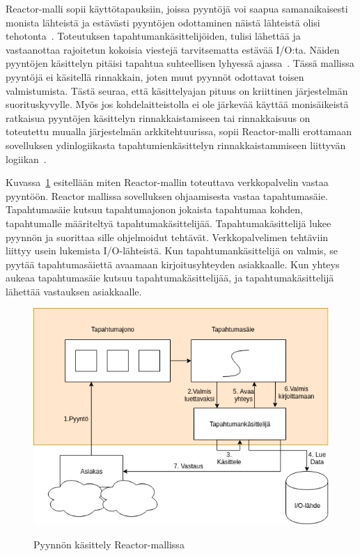\documentclass[finnish]{tktltiki2}
\theoremstyle{definition}
\theoremstyle{remark}
\begin{document}
Reactor-malli sopii käyttötapauksiin, joissa pyyntöjä voi saapua
samanaikaisesti monista lähteistä ja estävästi
pyyntöjen odottaminen näistä lähteistä olisi tehotonta~\cite{schmidt_reactor:_1995}.
Toteutuksen tapahtumankäsittelijöiden, tulisi
lähettää ja vastaanottaa rajoitetun kokoisia viestejä
tarvitsematta estävää I/O:ta.
Näiden pyyntöjen käsittelyn
pitäisi tapahtua suhteellisen lyhyessä ajassa~\cite{schmidt_reactor:_1995}.
Tässä mallissa pyyntöjä ei käsitellä rinnakkain, joten muut
pyynnöt odottavat toisen valmistumista.
Tästä seuraa, että käsittelyajan pituus on kriittinen järjestelmän
suorituskyvylle.
Myös jos kohdelaitteistolla ei ole järkevää käyttää monisäikeistä
ratkaisua pyyntöjen käsittelyn rinnakkaistamiseen tai rinnakkaisuus
on toteutettu muualla järjestelmän arkkitehtuurissa, sopii Reactor-malli
erottamaan sovelluksen ydinlogiikasta tapahtumienkäsittelyn
rinnakkaistammiseen liittyvän logiikan~\cite{schmidt_reactor:_1995}.

Kuvassa~\ref{fig:reactor} esitellään miten Reactor-mallin toteuttava verkkopalvelin
vastaa pyyntöön.
Reactor mallissa sovelluksen ohjaamisesta vastaa tapahtumasäie.
Tapahtumasäie kutsuu tapahtumajonon jokaista tapahtumaa kohden, tapahtumalle
määriteltyä tapahtumakäsittelijää. Tapahtumakäsittelijä
lukee pyynnön ja suorittaa sille ohjelmoidut tehtävät. Verkkopalvelimen
tehtäviin liittyy usein lukemista I/O-lähteistä.
Kun tapahtumankäsittelijä on valmis, se pyytää tapahtumasäiettä
avaamaan kirjoitusyhteyden asiakkaalle. Kun yhteys aukeaa
tapahtumasäie kutsuu tapahtumakäsittelijää, ja tapahtumakäsittelijä lähettää vastauksen
asiakkaalle.
\begin{figure}
  \centering
  \caption{Pyynnön käsittely Reactor-mallissa}
  \includegraphics[scale=0.5]{reactor.png}
  \label{fig:reactor}
\end{figure}
\end{document}
